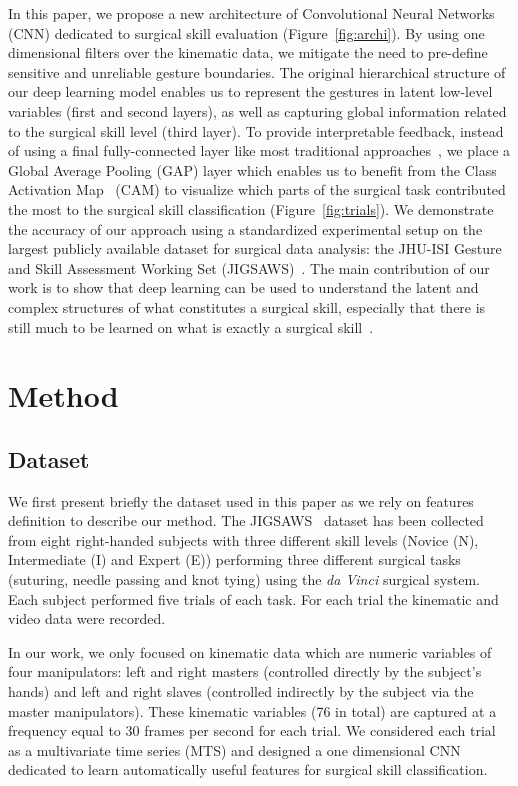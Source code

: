 \documentclass{llncs}
\begin{document}
 In this paper, we propose a new architecture of Convolutional Neural Networks (CNN) dedicated to surgical skill evaluation (Figure~\ref{fig:archi}).
By using one dimensional filters over the kinematic data, we mitigate the need to pre-define sensitive and unreliable gesture boundaries.
The original hierarchical structure of our deep learning model enables us to represent the gestures in latent low-level variables (first and second layers), as well as capturing global information related to the surgical skill level (third layer).
To provide interpretable feedback, instead of using a final fully-connected layer like most traditional approaches~\cite{zhou2016learning}, we place a Global Average Pooling (GAP) layer which enables us to benefit from the Class Activation Map~\cite{zhou2016learning} (CAM) to visualize which parts of the surgical task contributed the most to the surgical skill classification (Figure~\ref{fig:trials}).
We demonstrate the accuracy of our approach using a standardized experimental setup on the largest publicly available dataset for surgical data analysis: the JHU-ISI Gesture and Skill Assessment Working Set (JIGSAWS)~\cite{gao2014jhu}.
The main contribution of our work is to show that deep learning can be used to understand the latent and complex structures of what constitutes a surgical skill, especially that there is still much to be learned on what is exactly a surgical skill~\cite{kassahun2016surgical}.

\section{Method}

\subsection{Dataset}
We first present briefly the dataset used in this paper as we rely on features definition to describe our method.
The JIGSAWS~\cite{gao2014jhu} dataset has been collected from eight right-handed subjects with three different skill levels (Novice (N), Intermediate (I) and Expert (E)) performing three different surgical tasks (suturing, needle passing and knot tying) using the \emph{da Vinci} surgical system.
Each subject performed five trials of each task.
For each trial the kinematic and video data were recorded.

In our work, we only focused on kinematic data which are numeric variables of four manipulators: left and right masters (controlled directly by the subject's hands) and left and right slaves (controlled indirectly by the subject via the master manipulators). 
These kinematic variables (76 in total) are captured at a frequency equal to 30 frames per second for each trial.  
We considered each trial as a multivariate time series (MTS) and designed a one dimensional CNN dedicated to learn automatically useful features for surgical skill classification.   
\end{document}
